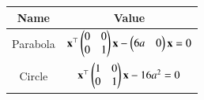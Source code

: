\begin{tabular}{|c|c|}
\hline
\textbf{Name} & \textbf{Value} \\
\hline
Parabola & $\mathbf{x}^\top\begin{pmatrix}0&0\\0&1\end{pmatrix}\mathbf{x} - \begin{pmatrix}6a & 0\end{pmatrix}\mathbf{x} = 0$ \\
\hline
Circle & $\mathbf{x}^\top\begin{pmatrix}1&0\\0&1\end{pmatrix}\mathbf{x} - 16a^2 = 0$ \\
\hline
\end{tabular}
